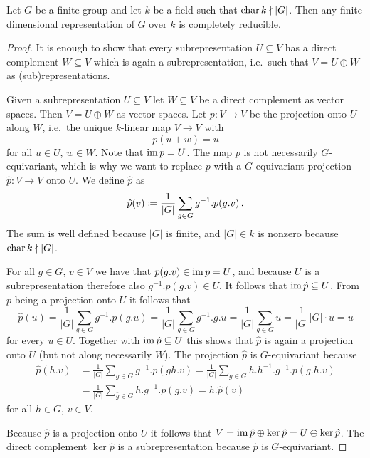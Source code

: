 \begin{theorem}
  Let $G$ be a finite group and let $k$ be a field such that $\operatorname{char} k \nmid |G|$.
  Then any finite dimensional representation of $G$ over $k$ is completely reducible.
\end{theorem}
\begin{proof}
  It is enough to show that every subrepresentation $U \subseteq V$ has a direct complement $W \subseteq V$ which is again a subrepresentation, i.e.\ such that $V = U \oplus W$ as (sub)representations.
  
  Given a subrepresentation $U \subseteq V$ let $W \subseteq V$ be a direct complement as vector spaces.
  Then $V = U \oplus W$ as vector spaces.
  Let $p \colon V \to V$ be the projection onto $U$ along $W$, i.e.\ the unique $k$-linear map $V \to V$ with
  \[
      p(u + w)
    = u
  \]
  for all $u \in U$, $w \in W$.
  Note that $\operatorname{im} p = U$.
  The map $p$ is not necessarily $G$-equivariant, which is why we want to replace $p$ with a $G$-equivariant projection $\hat{p} \colon V \to V$ onto $U$.
  We define $\hat{p}$ as
  \[
              \hat{p}(v)
    \coloneqq  \frac{1}{|G|} \sum_{g \in G} g^{-1}.p(g.v) \,.
  \]
  The sum is well defined because $|G|$ is finite, and $|G| \in k$ is nonzero because $\operatorname{char} k \nmid |G|$.
  
  For all $g \in G$, $v \in V$ we have that $p(g.v) \in \operatorname{im} p = U$, and because $U$ is a subrepresentation therefore also $g^{-1}.p(g.v) \in U$.
  It follows that $\operatorname{im} \hat{p} \subseteq U$.
  From $p$ being a projection onto $U$ it follows that
  \[
      \hat{p}(u)
    = \frac{1}{|G|} \sum_{g \in G} g^{-1}.p(g.u)
    = \frac{1}{|G|} \sum_{g \in G} g^{-1}.g.u
    = \frac{1}{|G|} \sum_{g \in G} u
    = \frac{1}{|G|} |G| \cdot u
    = u
  \]
  for every $u \in U$.
  Together with $\operatorname{im} \hat{p} \subseteq U$ this shows that $\hat{p}$ is again a projection onto $U$ (but not along necessarily $W$).
  The projection $\hat{p}$ is $G$-equivariant because 
  \begin{align*}
        \hat{p}(h.v)
    &=  \frac{1}{|G|} \sum_{g \in G} g^{-1}.p(gh.v)
     =  \frac{1}{|G|} \sum_{g \in G} h.h^{-1}.g^{-1}.p(g.h.v) \\
    &=  \frac{1}{|G|} \sum_{\bar{g} \in G} h.\bar{g}^{-1}.p(\bar{g}.v)
     =  h.\hat{p}(v)
  \end{align*}
  for all $h \in G$, $v \in V$.
  
  Because $\hat{p}$ is a projection onto $U$ it follows that $V = \operatorname{im} \hat{p} \oplus \ker \hat{p} = U \oplus \ker \hat{p}$.
  The direct complement $\ker \hat{p}$ is a subrepresentation because $\hat{p}$ is $G$-equivariant.
\end{proof}


